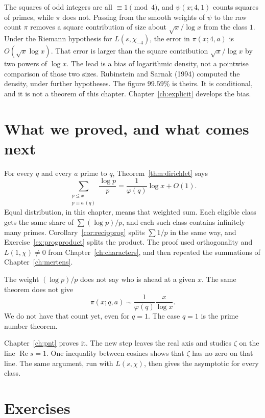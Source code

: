 \begin{remark}
The squares of odd integers are all $\equiv1\pmod4$, and $\psi(x;4,1)$ counts squares of primes, while $\pi$ does not. Passing from the smooth weights of $\psi$ to the raw count $\pi$ removes a square contribution of size about $\sqrt x/\log x$ from the class $1$. Under the Riemann hypothesis for $L(s,\chi_{-4})$, the error in $\pi(x;4,a)$ is $O(\sqrt x\log x)$. That error is larger than the square contribution $\sqrt x/\log x$ by two powers of $\log x$. The lead is a bias of logarithmic density, not a pointwise comparison of those two sizes. Rubinstein and Sarnak (1994) computed the density, under further hypotheses. The figure $99.59\%$ is theirs. It is conditional, and it is not a theorem of this chapter. Chapter~\ref{ch:explicit} develops the bias.
\end{remark}

\section{What we proved, and what comes next}

For every $q$ and every $a$ prime to $q$, Theorem~\ref{thm:dirichlet} says
\[
\sum_{\substack{p\le x\\p\equiv a\,(q)}}\frac{\log p}p=\frac1{\varphi(q)}\log x+O(1).
\]
Equal distribution, in this chapter, means that weighted sum. Each eligible class gets the same share of $\sum(\log p)/p$, and each such class contains infinitely many primes. Corollary~\ref{cor:recipprog} splits $\sum 1/p$ in the same way, and Exercise~\ref{ex:progproduct} splits the product. The proof used orthogonality and $L(1,\chi)\ne0$ from Chapter~\ref{ch:characters}, and then repeated the summations of Chapter~\ref{ch:mertens}.

The weight $(\log p)/p$ does not say who is ahead at a given $x$. The same theorem does not give
\[
\pi(x;q,a)\sim\frac1{\varphi(q)}\frac x{\log x}.
\]
We do not have that count yet, even for $q=1$. The case $q=1$ is the prime number theorem.

Chapter~\ref{ch:pnt} proves it. The new step leaves the real axis and studies $\zeta$ on the line $\operatorname{Re}s=1$. One inequality between cosines shows that $\zeta$ has no zero on that line. The same argument, run with $L(s,\chi)$, then gives the asymptotic for every class.

\section{Exercises}


